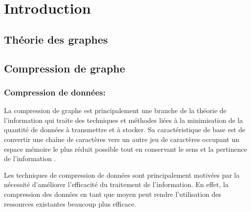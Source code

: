 \documentclass[11pt,a4paper]{report}
\theoremstyle{definition}
\begin{document}







\tableofcontents
\newpage

\listoffigures
{}
\cleardoublepage


\listoftables
{}
\cleardoublepage



\part{Introduction} 


	\chapter{ Théorie des graphes}
	  
	

	\chapter{Compression de graphe}
	
		\section{Compression de données: }
		
		 La compression de graphe est principalement une branche de la théorie de l'information  qui traite des techniques et méthodes liées à la minimisation de la quantité de données à transmettre et à stocker.
Sa caractéristique de base est de convertir une chaîne de caractères vers un autre jeu de caractères occupant un espace mémoire le plus réduit possible tout en conservant le sens et la pertinence de l'information \citep{lelewer1987data}.

	Les techniques de compression de données sont principalement motivées par la nécessité d'améliorer l'efficacité du traitement de l'information. En effet, la compression des données en tant que moyen peut rendre l'utilisation des ressources existantes beaucoup plus efficace. 
	
\end{document}
